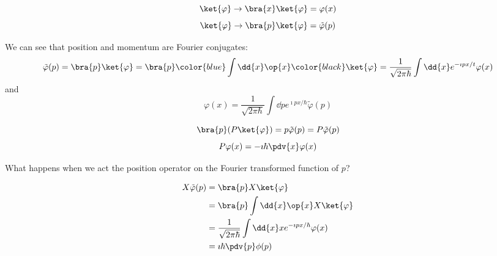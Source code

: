 \documentclass[a4paper,twoside,master.tex]{subfiles}
\begin{document}

\begin{equation}
    \ket{\varphi} \to \bra{x} \ket{\varphi} = \varphi (x)
\end{equation}
\begin{equation}
    \ket{\varphi} \to \bra{p} \ket{\varphi} = \tilde{\varphi}(p)
\end{equation}

We can see that position and momentum are Fourier conjugates:
\begin{equation}
    \tilde{\varphi}(p) = \bra{p} \ket{\varphi} = \bra{p}\color{blue} \int \dd{x} \op{x}\color{black} \ket{\varphi} = \frac{1}{\sqrt{2 \pi \hbar}} \int \dd{x} e^{- \imath p x / t} \varphi (x)
\end{equation}
and
\begin{equation}
    \varphi (x) = \frac{1}{\sqrt{2 \pi \hbar}} \int \dd{p} e^{\imath px/\hbar} \tilde{\varphi}(p)
\end{equation}

\begin{equation}
    \bra{p} (P \ket{\varphi} ) = p \tilde{\varphi}(p) = P \tilde{\varphi}(p)
\end{equation}
\begin{equation}
    P \varphi(x) = -\imath\hbar \pdv{x} \varphi (x)
\end{equation}

What happens when we act the position operator on the Fourier transformed function of $ p $?

\begin{align}
    X \tilde{\varphi}(p) &= \bra{p} X \ket{\varphi}\\
    &= \bra{p} \int \dd{x} \op{x}  X \ket{\varphi}\\
    &= \frac{1}{\sqrt{2 \pi \hbar}} \int \dd{x} x e^{-\imath p x/\hbar} \varphi (x)\\
    &= \imath\hbar \pdv{p}\phi(p)
\end{align}
\end{document}
